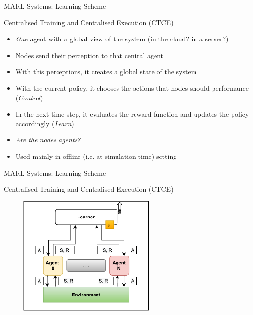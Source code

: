 \documentclass[presentation]{beamer}\mode<presentation>{\usetheme{AMSBolognaFC}}
\begin{document}
\begin{frame}{MARL Systems: Learning Scheme}
	\begin{exampleblock}{Centralised Training and Centralised Execution (CTCE)}
		\begin{itemize}
			\item \emph{One} agent with a global view of the system (in the cloud? in a server?)
			\item Nodes send their perception to that central agent
			\item With this perceptions, it creates a global state of the system
			\item With the current policy, it chooses the actions that nodes should performance (\emph{Control})
			\item In the next time step, it evaluates the reward function and updates the policy accordingly (\emph{Learn})
			\item \emph{Are the nodes agents?}
			\item Used mainly in offline (i.e. at simulation time) setting 
		\end{itemize}
	\end{exampleblock}

\end{frame}

\begin{frame}{MARL Systems: Learning Scheme}
	\begin{exampleblock}{Centralised Training and Centralised Execution (CTCE)}
		\begin{figure}
			\includegraphics[height=6cm]{img/learning-scheme-clce.pdf}
		\end{figure}
	\end{exampleblock}
\end{frame}
\end{document}
